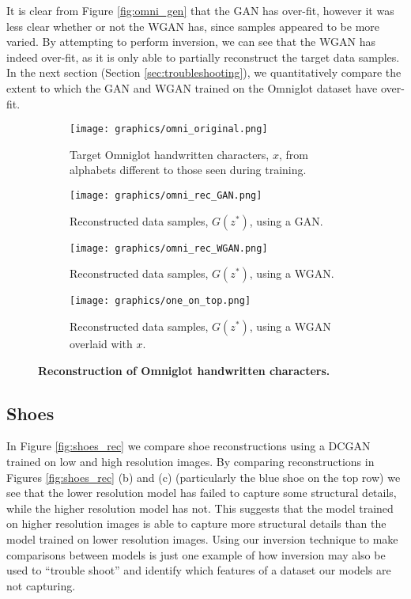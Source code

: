 \documentclass[journal]{IEEEtran}
\begin{document}
It is clear from Figure \ref{fig:omni_gen} that the GAN has over-fit, however it was less clear whether or not the WGAN has, since samples appeared to be more varied. By attempting to perform inversion, we can see that the WGAN has indeed over-fit, as it is only able to partially reconstruct the target data samples. In the next section (Section \ref{sec:troubleshooting}), we quantitatively compare the extent to which the GAN and WGAN trained on the Omniglot dataset have over-fit.


\begin{figure}[h]
\centering
    \begin{subfigure}{\columnwidth}
    \centering
        \texttt{[image: graphics/omni\_original.png]}
        \caption{ Target Omniglot handwritten characters, $x$, from alphabets different to those seen during training.}
    \end{subfigure}
    \begin{subfigure}{\columnwidth}
        \texttt{[image: graphics/omni\_rec\_GAN.png]} %
        \caption{Reconstructed data samples, $G(z^*)$, using a GAN.}
    \end{subfigure}
    \begin{subfigure}{\columnwidth}
        \texttt{[image: graphics/omni\_rec\_WGAN.png]} %
        \caption{Reconstructed data samples, $G(z^*)$, using a WGAN.}
    \end{subfigure}
    \begin{subfigure}{\columnwidth}
        \texttt{[image: graphics/one\_on\_top.png]}
        \caption{Reconstructed data samples, $G(z^*)$, using a WGAN overlaid with $x$.}
    \end{subfigure}
    \caption{\textbf{Reconstruction of Omniglot handwritten characters.}}
    \label{fig:omni_rec}
\end{figure}


\subsection{Shoes}
\label{rec:shoes_rec}
In Figure \ref{fig:shoes_rec} we compare shoe reconstructions using a DCGAN trained on low and high resolution images. By comparing reconstructions in Figures \ref{fig:shoes_rec} (b) and (c) (particularly the blue shoe on the top row) we see that the lower resolution model has failed to capture some structural details, while the higher resolution model has not. This suggests that the model trained on higher resolution images is able to capture more structural details than the model trained on lower resolution images. Using our inversion technique to make comparisons between models is just one example of how inversion may also be used to ``trouble shoot'' and identify which features of a dataset our models are not capturing.
\end{document}
